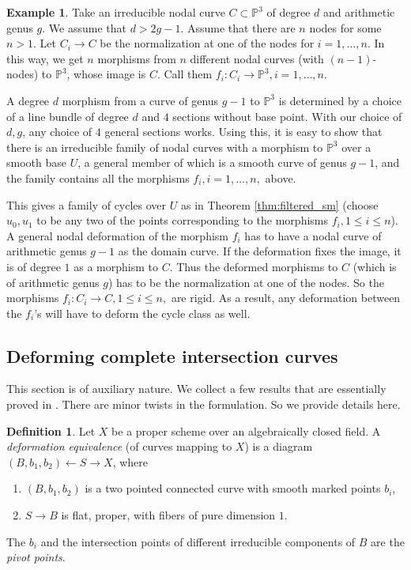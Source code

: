 \documentclass{amsart}
\theoremstyle{definition}
\newtheorem{defn}[theorem]{Definition}
\newtheorem{ex}[theorem]{Example}
\theoremstyle{remark}
\newcommand{\mbb}{\mathbb}
\newcommand{\PP}{\mbb{P}}
\begin{document}
\begin{ex}\label{ex}
Take an irreducible nodal curve $C \subset \PP^3$ of degree $d$ and arithmetic genus $g$.
We assume that $d>2g-1$.
Assume that there are $n$ nodes for some $n>1$.
Let $C_i \to C$ be the normalization at one of the nodes for $i=1,\ldots, n$. In this way, we get $n$ morphisms from $n$ different nodal curves (with $(n-1)$-nodes) to $\PP^3$, whose image is $C$.
Call them $f_i: C_i \to \PP^3, i=1, \ldots, n$.

A degree $d$ morphism from a curve of genus $g-1$ to $\PP^3$ is determined by a choice of a line bundle of degree $d$ and $4$ sections without base point.
With our choice of $d, g$, any choice of $4$ general sections works.
Using this, it is easy to show that there is an irreducible family of nodal curves with a morphism to $\PP^3$ over a smooth base $U$, a general member of which is a smooth curve of genus $g-1$, and the family contains all the  morphisms $f_i, i=1, \ldots, n,$ above.

This gives a family of cycles over $U$ as in Theorem \ref{thm:filtered_sm} (choose $u_0, u_1$ to be any two of the points corresponding to the morphisms $f_i, 1 \leq i \leq n$).
A general nodal deformation of the morphism $f_i$ has to have a nodal curve of arithmetic genus $g-1$ as the domain curve. 
If the deformation fixes the image, it is of degree $1$ as a morphism to $C$. 
Thus the deformed morphisms to $C$ (which is of arithmetic genus $g$) has to be the normalization at one of the nodes.
So the morphisms $f_i: C_i \to C, 1 \leq i \leq n,$ are rigid.
As a result, any deformation between the $f_i$'s will have to deform the cycle class as well.
\end{ex}
\subsection{Deforming complete intersection curves}
This section is of auxiliary nature. We collect a few results that are essentially proved in \cite{Kollar_Tian}. 
There are minor twists in the formulation.
So we provide details here.
\begin{defn}\label{def:deformation}
    Let $X$ be a proper scheme over an algebraically closed field. A \emph{deformation equivalence} (of curves mapping to $X$) is a diagram $(B, b_1, b_2) \leftarrow S \to X$, where    
\begin{enumerate}
    \item $(B, b_1, b_2)$ is a two pointed connected curve with smooth marked points $b_i$, 
    \item $S\to B$ is flat, proper, with fibers of pure dimension $1$.
\end{enumerate}

The $b_i$ and the intersection points of different irreducible components of $B$ are the \emph{pivot points}.
\end{defn}
\end{document}
